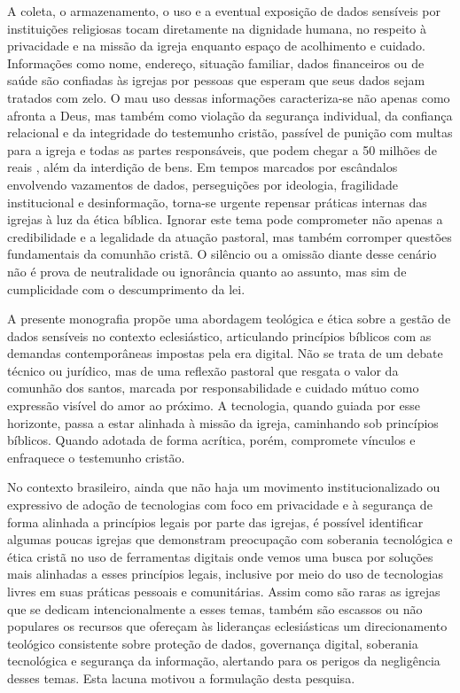 A coleta, o armazenamento, o uso e a eventual exposição de dados sensíveis por instituições religiosas tocam diretamente na dignidade humana, no respeito à privacidade e na missão da igreja enquanto espaço de acolhimento e cuidado. Informações como nome, endereço, situação familiar, dados financeiros ou de saúde são confiadas às igrejas por pessoas que esperam que seus dados sejam tratados com zelo. O mau uso dessas informações caracteriza-se não apenas como afronta a Deus, mas também como violação da segurança individual, da confiança relacional e da integridade do testemunho cristão, passível de punição com multas para a igreja e todas as partes responsáveis, que podem chegar a 50 milhões de reais \cite{lgpd2018}, além da interdição de bens. Em tempos marcados por escândalos envolvendo vazamentos de dados, perseguições por ideologia, fragilidade institucional e desinformação, torna-se urgente repensar práticas internas das igrejas à luz da ética bíblica. Ignorar este tema pode comprometer não apenas a credibilidade e a legalidade da atuação pastoral, mas também corromper questões fundamentais da comunhão cristã. O silêncio ou a omissão diante desse cenário não é prova de neutralidade ou ignorância quanto ao assunto, mas sim de cumplicidade com o descumprimento da lei.

A presente monografia propõe uma abordagem teológica e ética sobre a gestão de dados sensíveis no contexto eclesiástico, articulando princípios bíblicos com as demandas contemporâneas impostas pela era digital. Não se trata de um debate técnico ou jurídico, mas de uma reflexão pastoral que resgata o valor da comunhão dos santos, marcada por responsabilidade e cuidado mútuo como expressão visível do amor ao próximo. A tecnologia, quando guiada por esse horizonte, passa a estar alinhada à missão da igreja, caminhando sob princípios bíblicos. Quando adotada de forma acrítica, porém, compromete vínculos e enfraquece o testemunho cristão.

No contexto brasileiro, ainda que não haja um movimento institucionalizado ou expressivo de adoção de tecnologias com foco em privacidade e à segurança de forma alinhada a princípios legais por parte das igrejas, é possível identificar algumas poucas igrejas que demonstram preocupação com soberania tecnológica e ética cristã no uso de ferramentas digitais onde vemos uma busca por soluções mais alinhadas a esses princípios legais, inclusive por meio do uso de tecnologias livres em suas práticas pessoais e comunitárias. Assim como são raras as igrejas que se dedicam intencionalmente a esses temas, também são escassos ou não populares os recursos que ofereçam às lideranças eclesiásticas um direcionamento teológico consistente sobre proteção de dados, governança digital, soberania tecnológica e segurança da informação, alertando para os perigos da negligência desses temas. Esta lacuna motivou a formulação desta pesquisa.

